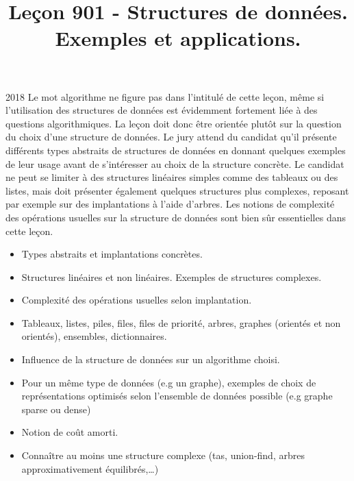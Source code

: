 \documentclass{agregfiche}
\title{Leçon 901 - Structures de données. Exemples et applications.}
\begin{document}
\maketitle

\secrapports
\begin{rapport}{2018}
	Le mot algorithme ne figure pas dans l’intitulé de cette leçon, même si l’utilisation des structures de
	données est évidemment fortement liée à des questions algorithmiques. La leçon doit donc être orientée
	plutôt sur la question du choix d’une structure de données. Le jury attend du candidat qu’il présente
	différents types abstraits de structures de données en donnant quelques exemples de leur usage avant de
	s’intéresser au choix de la structure concrète. Le candidat ne peut se limiter à des structures linéaires
	simples comme des tableaux ou des listes, mais doit présenter également quelques structures plus
	complexes, reposant par exemple sur des implantations à l’aide d’arbres. Les notions de complexité des
	opérations usuelles sur la structure de données sont bien sûr essentielles dans cette leçon.
\end{rapport}

\secindispensables

\begin{itemize}
	\item  Types abstraits et implantations concrètes.
    \item Structures linéaires et non linéaires. Exemples de structures complexes.
	\item Complexité des opérations usuelles selon implantation.
\end{itemize}

\secasavoir

\begin{itemize}
	\item  Tableaux, listes, piles, files, files de priorité, arbres, graphes (orientés et non orientés), ensembles, dictionnaires.
    \item Influence de la structure de données sur un algorithme choisi.
    \item Pour un même type de données (e.g un graphe), exemples de choix de représentations optimisés selon l'ensemble de données possible (e.g graphe sparse ou dense)
	\item Notion de coût amorti.
    \item Connaître au moins une structure complexe (tas, union-find, arbres approximativement équilibrés,\dots)
	
\end{itemize}
\end{document}

